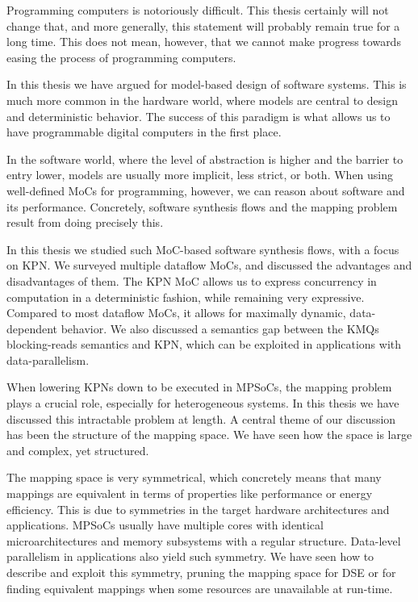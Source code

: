 Programming computers is notoriously difficult.
This thesis certainly will not change that, and more generally, this statement will probably remain true for a long time.
This does not mean, however, that we cannot make progress towards easing the process of programming computers.

In this thesis we have argued for model-based design of software systems.
This is much more common in the hardware world, where models are central to design and deterministic behavior.
The success of this paradigm is what allows us to have programmable digital computers in the first place.

In the software world, where the level of abstraction is higher and the barrier to entry lower, models are usually more implicit, less strict, or both.
When using well-defined \acfp{MoC} for programming, however, we can reason about software and its performance.
Concretely, software synthesis flows and the mapping problem result from doing precisely this.

In this thesis we studied such \ac{MoC}-based software synthesis flows, with a focus on \acf{KPN}.
We surveyed multiple dataflow \acp{MoC}, and discussed the advantages and disadvantages of them. 
The \ac{KPN} \ac{MoC} allows us to express concurrency in computation in a deterministic fashion, while remaining very expressive.
Compared to most dataflow \acp{MoC}, it allows for maximally dynamic, data-dependent behavior.
We also discussed a semantics gap between the \acfp{KMQ} blocking-reads semantics and \ac{KPN}, which can be exploited in applications with data-parallelism.

When lowering \acp{KPN} down to be executed in \acp{MPSoC}, the mapping problem plays a crucial role, especially for heterogeneous systems.
In this thesis we have discussed this intractable problem at length.
A central theme of our discussion has been the structure of the mapping space.
We have seen how the space is large and complex, yet structured.

The mapping space is very symmetrical, which concretely means that many mappings are equivalent in terms of properties like performance or energy efficiency.
This is due to symmetries in the target hardware architectures and applications.
\acp{MPSoC} usually have multiple cores with identical microarchitectures and memory subsystems with a regular structure.
Data-level parallelism in applications also yield such symmetry.
We have seen how to describe and exploit this symmetry, pruning the mapping space for \acf{DSE} or for finding equivalent mappings when some resources are unavailable at run-time.

